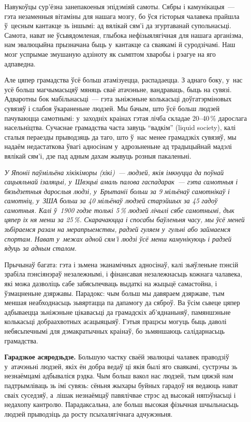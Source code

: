 Навукоўцы сур'ёзна занепакоеныя эпідэміяй самоты. Сябры і камунікацыя~--- гэта незаменныя вітаміны для нашага мозгу, бо ўся гісторыя чалавека прайшла ў~цесным кантакце зь іншымі: ад вялікай сям'і да згуртаванай супольнасьці. Самота, нават не ўсьвядомленая, глыбока нефізыялягічная для нашага арганізма, нам эвалюцыйна прызначана быць у~кантакце са сваякамі й суродзічамі. Наш мозг успрымае змушаную адзіноту як сымптом хваробы і рэагуе на яго адпаведна.

Але цяпер грамадства ўсё больш атамізуецца, распадаецца. З аднаго боку, у~нас усё больш магчымасьцяў мяняць сваё атачэньне, вандраваць, быць на сувязі. Адваротны бок мабільнасьці~--- гэта зьніжэньне колькасьці доўгатэрміновых сувязяў і слабоя ўкараненьне людзей. Мы бачым, што ўсё больш людзей пачуваюцца самотнымі: у~заходніх краінах гэтая лічба складае 20--40\,\% дарослага насельніцтва. Сучаснае грамадства часта завуць ``вадкім'' (liquid society), калі сталыя пераезды прыводзяць да таго, што ў~нас менее грамадзкіх сувязяў, мы надаём недастаткова ўвагі адносінам у~адрозьненьне ад традыцыйнай мадэлі вялікай сям'і, дзе пад адным дахам жывуць розныя пакаленьні.

\emph{У Японіі паўмільёна хікікіморы (хікі)~--- людзей, якія імкнуцца да поўнай сацыяльнай ізаляцыі, у~Швэцыі амаль палова гаспадарак~--- гэта самотныя і бязьдзетныя дарослыя людзі, у~Брытаніі больш за 9 мільёнаў самотнікаў і самотніц, у~ЗША больш за 40 мільёнаў людзей старэйшых за 45 гадоў самотныя. Калі ў~1900 годзе толькі 5\,\% людзей лічылі сябе самотнымі, дык цяпер іх ня менш за 25\,\%. Скарачаюцца і спосабы баўленьня часу, мы ўсё меней зьбіраемся разам на мерапрыемствы, радзей гуляем у~гульні або займаемся спортам. Нават у~межах адной сям'і людзі ўсё менш камунікуюць і радзей ядуць за адным сталом.}

Прычынаў багата: гэта і зьмена эканамічных адносінаў, калі зьяўленьне пэнсій зрабіла пэнсіянэраў незалежнымі, і фінансавая незалежнасьць кожнага чалавека, які можа дазволіць сабе забясьпечваць выдаткі на жыцьцё самастойна, і ўзмацненьне дзяржавы. Парадокс: чым больш мы давяраем дзяржаве, тым меншая неабходнасьць зьвяртацца па дапамогу да сяброў. Ва ўсім сьвеце цяпер адбываецца зьніжэньне цікавасьці да грамадскіх аб'яднаньняў, памяншэньне колькасьці добраахвотных асацыяцыяў. Гэтыя працэсы могуць быць даволі небясьпечнымі для дэмакратычных краінаў, бо зьмяншаюць салідарнасьць грамадства.

\textbf{Гарадзкое асяродзьдзе.} Большую частку сваёй эвалюцыі чалавек праводзіў у~атачэньні людзей, якіх ён добра ведаў ці якія былі яго сваякамі, сустрэчы зь незнаёмцамі адбываліся рэдка. Чым больш вакол нас людзей, тым цяжэй нам падтрымліваць зь імі сувязь: сёньня жыхары буйных гарадоў ня ведаюць нават сваіх суседзяў, а~лішак незнаёмцаў павялічвае стрэс ад высокай няпэўнасьці і недахопу кантролю. Парадаксальна, але больш высокая фізычная шчыльнасьць людзей прыводзіць да росту псыхалягічнага адчужэньня.

